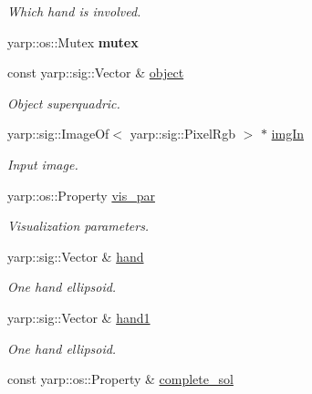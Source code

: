 \begin{DoxyCompactItemize}
\begin{DoxyCompactList}\small\item\em Which hand is involved. \end{DoxyCompactList}\item 
yarp\+::os\+::\+Mutex {\bfseries mutex}\label{classGraspVisualization_a2fd6a0f8c21ddf8097efe413cfd16bea}

\item 
const yarp\+::sig\+::\+Vector \& \hyperlink{classGraspVisualization_a2d3a7e82db39172cf777189f4b006dbf}{object}\label{classGraspVisualization_a2d3a7e82db39172cf777189f4b006dbf}

\begin{DoxyCompactList}\small\item\em Object superquadric. \end{DoxyCompactList}\item 
yarp\+::sig\+::\+Image\+Of$<$ yarp\+::sig\+::\+Pixel\+Rgb $>$ $\ast$ \hyperlink{classGraspVisualization_a67af368e12d13ef91e99e01a92e60850}{img\+In}\label{classGraspVisualization_a67af368e12d13ef91e99e01a92e60850}

\begin{DoxyCompactList}\small\item\em Input image. \end{DoxyCompactList}\item 
yarp\+::os\+::\+Property \hyperlink{classGraspVisualization_a0efcb3e2545e09b7480da109ceaa4533}{vis\+\_\+par}\label{classGraspVisualization_a0efcb3e2545e09b7480da109ceaa4533}

\begin{DoxyCompactList}\small\item\em Visualization parameters. \end{DoxyCompactList}\item 
yarp\+::sig\+::\+Vector \& \hyperlink{classGraspVisualization_af6ecf326ddb626e2dd7f83e8d75d12eb}{hand}\label{classGraspVisualization_af6ecf326ddb626e2dd7f83e8d75d12eb}

\begin{DoxyCompactList}\small\item\em One hand ellipsoid. \end{DoxyCompactList}\item 
yarp\+::sig\+::\+Vector \& \hyperlink{classGraspVisualization_a23c0f2f9e30b20ff6ec38e0fe119ab39}{hand1}\label{classGraspVisualization_a23c0f2f9e30b20ff6ec38e0fe119ab39}

\begin{DoxyCompactList}\small\item\em One hand ellipsoid. \end{DoxyCompactList}\item 
const yarp\+::os\+::\+Property \& \hyperlink{classGraspVisualization_a542f3bc536b354d12256f2c95fcadab1}{complete\+\_\+sol}\label{classGraspVisualization_a542f3bc536b354d12256f2c95fcadab1}


\end{DoxyCompactItemize}
